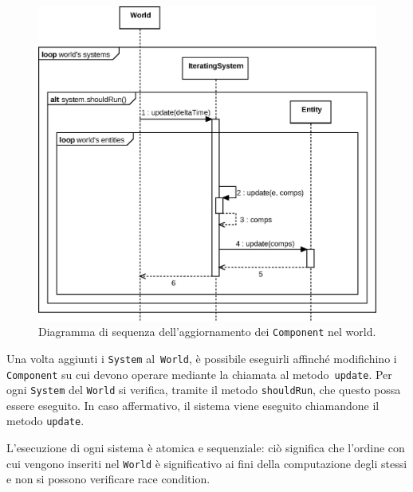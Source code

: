 \begin{figure}[H]
    \centering
    \includegraphics[width=\textwidth]{./img/Sequence}
    \caption{Diagramma di sequenza dell'aggiornamento dei \texttt{Component} nel world.}\label{fig:sequence}
\end{figure}

Una volta aggiunti i \texttt{System} al~\texttt{World}, è possibile eseguirli affinché modifichino i \texttt{Component}
su cui devono operare mediante la chiamata al metodo~\texttt{update}.
Per ogni \texttt{System} del \texttt{World} si verifica, tramite il metodo \texttt{shouldRun}, che questo possa essere
eseguito.
In caso affermativo, il sistema viene eseguito chiamandone il metodo \texttt{update}.

L'esecuzione di ogni sistema è atomica e sequenziale: ciò significa che l'ordine con cui vengono inseriti nel
\texttt{World} è significativo ai fini della computazione degli stessi e non si possono verificare race condition.

